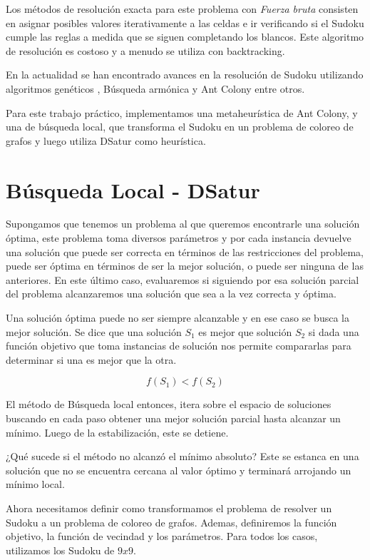 \documentclass[a4paper,spanish]{article}
\begin{document}
Los métodos de resolución exacta para este problema con \emph{Fuerza bruta}
consisten en asignar posibles valores iterativamente a las celdas e ir
verificando si el Sudoku cumple las reglas a medida que se siguen completando
los blancos. Este algoritmo de resolución es costoso y a menudo se utiliza con backtracking.


En la actualidad se han encontrado avances en la resolución de Sudoku utilizando
algoritmos genéticos \cite{genetic}, Búsqueda armónica
\cite{harmony} y Ant Colony \cite{ant_colony} entre otros.

Para este trabajo práctico, implementamos una metaheurística de Ant Colony, y una
de búsqueda local, que transforma el Sudoku en un problema de coloreo de grafos y
luego utiliza DSatur\cite{dsatur} como heurística.


\section{Búsqueda Local - DSatur}

Supongamos que tenemos un problema al que queremos encontrarle una solución
óptima, este problema toma diversos parámetros y por cada instancia
devuelve una solución que puede ser correcta en términos de las restricciones
del problema, puede ser óptima en términos de ser la mejor solución, o puede ser
ninguna de las anteriores. En este último caso, evaluaremos si siguiendo por esa
solución parcial del problema alcanzaremos una solución que sea a la vez
correcta y óptima.

Una solución óptima puede no ser siempre alcanzable y en ese caso se busca la
mejor solución. Se dice que una solución $S_1$ es mejor que solución $S_2$ si
dada una función objetivo  que toma instancias de solución nos permite
compararlas para determinar si una es mejor que la otra.

\begin{equation}
    f(S_1) < f(S_2) 
\end{equation}


El método de Búsqueda local entonces, itera sobre el espacio de soluciones
buscando en cada paso obtener una mejor solución parcial hasta alcanzar un
mínimo. Luego de la estabilización, este se detiene.

¿Qué sucede si el método no alcanzó el mínimo absoluto? Este se estanca
en una solución que no se encuentra cercana al valor óptimo y terminará
arrojando un mínimo local.


Ahora necesitamos definir como transformamos el problema de resolver un Sudoku
a un problema de coloreo de grafos.
Ademas, definiremos la función objetivo, la función de vecindad y los parámetros.
Para todos los casos, utilizamos los Sudoku de $ 9x9 $.
\end{document}
